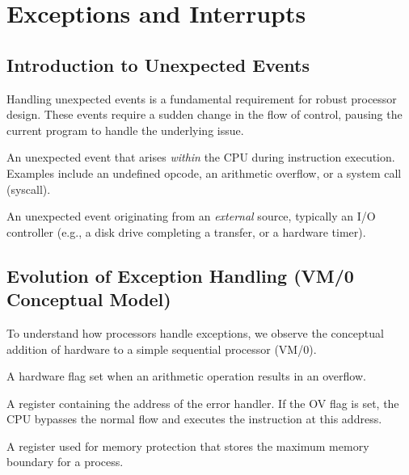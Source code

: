 \chapter{Exceptions and Interrupts}

\section{Introduction to Unexpected Events}
Handling unexpected events is a fundamental requirement for robust processor design. These events require a sudden change in the flow of control, pausing the current program to handle the underlying issue.

\begin{definition}[Exception]
An unexpected event that arises \textit{within} the CPU during instruction execution. Examples include an undefined opcode, an arithmetic overflow, or a system call (syscall).
\end{definition}

\begin{definition}[Interrupt]
An unexpected event originating from an \textit{external} source, typically an I/O controller (e.g., a disk drive completing a transfer, or a hardware timer).
\end{definition}

\section{Evolution of Exception Handling (VM/0 Conceptual Model)}
To understand how processors handle exceptions, we observe the conceptual addition of hardware to a simple sequential processor (VM/0).

\begin{vocabulary}
A hardware flag set when an arithmetic operation results in an overflow.
\end{vocabulary}

\begin{vocabulary}
A register containing the address of the error handler. If the OV flag is set, the CPU bypasses the normal flow and executes the instruction at this address.
\end{vocabulary}

\begin{vocabulary}
A register used for memory protection that stores the maximum memory boundary for a process.
\end{vocabulary}

